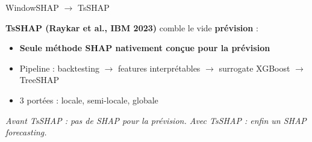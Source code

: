 \documentclass[10pt]{beamer}
\begin{document}
\begin{frame}{WindowSHAP $\to$ TsSHAP}
  \begin{plusbox}
    \textbf{TsSHAP (Raykar et al., IBM 2023)} comble le vide \textbf{prévision} :
    \begin{itemize}
      \item \textbf{Seule méthode SHAP nativement conçue pour la prévision}
      \item Pipeline : backtesting $\to$ features interprétables $\to$ surrogate XGBoost $\to$ TreeSHAP
      \item 3 portées : locale, semi-locale, globale
    \end{itemize}
    \vspace{2pt}\centering
    \emph{Avant TsSHAP : pas de SHAP pour la prévision. Avec TsSHAP : enfin un SHAP forecasting.}
  \end{plusbox}
\end{frame}
\end{document}
